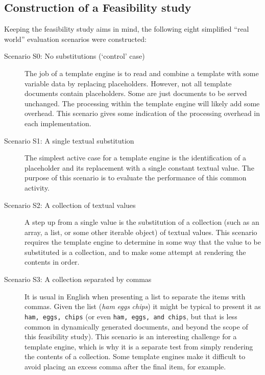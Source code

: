\subsection{Construction of a Feasibility study}

Keeping the feasibility study aims in mind, the following eight simplified \enquote{real world} evaluation scenarios were constructed:

\begin{description}
\item[Scenario S0: No substitutions (`control' case)] \hfill

The job of a template engine is to read and combine a template with some variable data by replacing placeholders. However, not all template documents contain placeholders. Some are just documents to be served unchanged. The processing within the template engine will likely add some overhead. This scenario gives some indication of the processing overhead in each implementation.

\item[Scenario S1: A single textual substitution] \hfill

The simplest active case for a template engine is the identification of a placeholder and its replacement with a single constant textual value. The purpose of this scenario is to evaluate the performance of this common activity.

\item[Scenario S2: A collection of textual values] \hfill

A step up from a single value is the substitution of a collection (such as an array, a list, or some other iterable object) of textual values. This scenario requires the template engine to determine in some way that the value to be substituted is a collection, and to make some attempt at rendering the contents in order.

\item[Scenario S3: A collection separated by commas] \hfill

It is usual in English when presenting a list to separate the items with commas. Given the list (\emph{ham} \emph{eggs} \emph{chips}) it might be typical to present it as \texttt{ham, eggs, chips} (or even \texttt{ham, eggs, and chips}, but that is less common in dynamically generated documents, and beyond the scope of this feasibility study). This scenario is an interesting challenge for a template engine, which is why it is a separate test from simply rendering the contents of a collection. Some template engines make it difficult to avoid placing an excess comma after the final item, for example.


\end{description}
